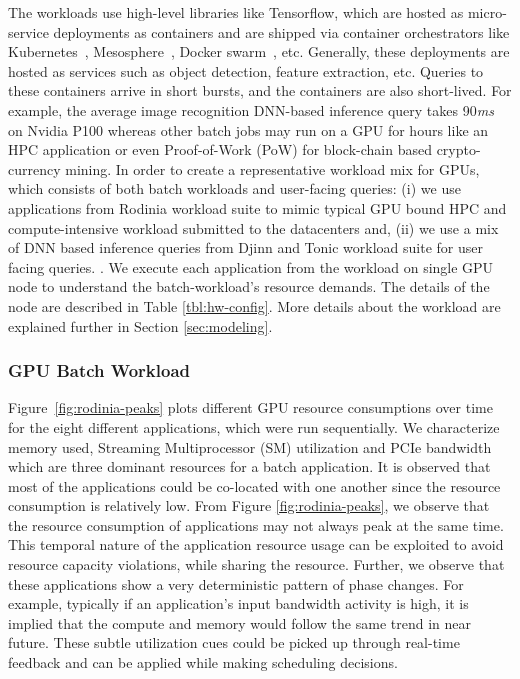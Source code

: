 The workloads use high-level libraries like Tensorflow, which are hosted as micro-service deployments as containers and are shipped via container orchestrators like Kubernetes~\cite{kubernetes}, Mesosphere~\cite{mesosp}, Docker swarm~\cite{swarm}, etc. Generally, these deployments are hosted as services such as object detection, feature extraction, etc. Queries to these containers arrive in short bursts, and the containers are also short-lived. For example, the average image recognition DNN-based inference query takes 90\textit{ms} on Nvidia P100 \cite{nvidia-dnn} whereas other batch jobs may run on a GPU for hours like an HPC application or even Proof-of-Work (PoW) for block-chain based crypto-currency mining.
In order to create a representative workload mix for GPUs, which consists of both batch workloads and user-facing queries: (i) we use applications from Rodinia workload suite \cite{che2009rodinia} to mimic typical GPU bound HPC and compute-intensive workload submitted to the datacenters and, (ii) we use a mix of DNN based inference queries from Djinn and Tonic workload suite for user facing queries. \cite{hauswald2015djinn}. We execute each application from the workload on single GPU node to understand the batch-workload's resource demands. The details of the node are described in Table \ref{tbl:hw-config}. More details about the workload are explained further in Section \ref{sec:modeling}.


\subsubsection{GPU Batch Workload}
Figure~\ref{fig:rodinia-peaks} plots different GPU resource consumptions over time for the eight different applications, which were run sequentially. We characterize memory used, Streaming Multiprocessor (SM) utilization and PCIe bandwidth which are three dominant resources for a batch application. It is observed that most of the applications could be co-located with one another since the resource consumption is relatively low. From Figure \ref{fig:rodinia-peaks}, we observe that the resource consumption of applications may not always peak at the same time. This temporal nature of the application resource usage can be exploited to avoid resource capacity violations, while sharing the resource. Further, we observe that these applications show a very deterministic pattern of phase changes. For example, typically if an application's input bandwidth activity is high, it is implied that the compute and memory would follow the same trend in near future. These subtle utilization cues could be picked up through real-time feedback and can be applied while making scheduling decisions. 

